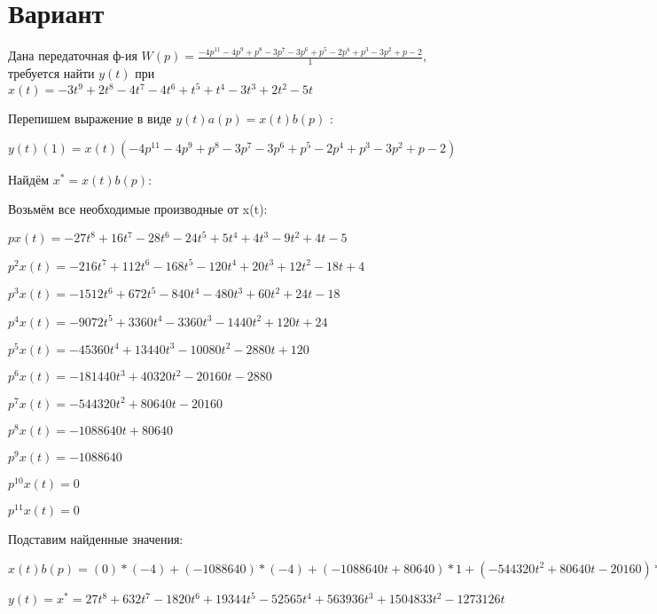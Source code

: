 \documentclass{article}
\begin{document}
{\section{Вариант}

Дана передаточная ф-ия $W(p)=\frac{-4p^{11}-4p^{9}+p^{8}-3p^{7}-3p^{6}+p^{5}-2p^{4}+p^{3}-3p^{2}+p-2}{1}$, требуется найти $y(t)$ при $x(t)=-3t^{9}+2t^{8}-4t^{7}-4t^{6}+t^{5}+t^{4}-3t^{3}+2t^{2}-5t$

Перепишем выражение в виде $y(t)a(p)=x(t)b(p)$ :

$y(t)(1)=x(t)(-4p^{11}-4p^{9}+p^{8}-3p^{7}-3p^{6}+p^{5}-2p^{4}+p^{3}-3p^{2}+p-2)$

Найдём $x^*=x(t)b(p)$:

Возьмём все необходимые производные от x(t):

$px(t)=-27t^{8}+16t^{7}-28t^{6}-24t^{5}+5t^{4}+4t^{3}-9t^{2}+4t-5$

$p^2x(t)=-216t^{7}+112t^{6}-168t^{5}-120t^{4}+20t^{3}+12t^{2}-18t+4$

$p^3x(t)=-1512t^{6}+672t^{5}-840t^{4}-480t^{3}+60t^{2}+24t-18$

$p^4x(t)=-9072t^{5}+3360t^{4}-3360t^{3}-1440t^{2}+120t+24$

$p^5x(t)=-45360t^{4}+13440t^{3}-10080t^{2}-2880t+120$

$p^6x(t)=-181440t^{3}+40320t^{2}-20160t-2880$

$p^7x(t)=-544320t^{2}+80640t-20160$

$p^8x(t)=-1088640t+80640$

$p^9x(t)=-1088640$

$p^10x(t)=0$

$p^11x(t)=0$

Подставим найденные значения:

$x(t)b(p) = (0)*(-4)+(-1088640)*(-4)+(-1088640t+80640)*1+(-544320t^{2}+80640t-20160)*(-3)+(-181440t^{3}+40320t^{2}-20160t-2880)*(-3)+(-45360t^{4}+13440t^{3}-10080t^{2}-2880t+120)*1+(-9072t^{5}+3360t^{4}-3360t^{3}-1440t^{2}+120t+24)*(-2)+(-1512t^{6}+672t^{5}-840t^{4}-480t^{3}+60t^{2}+24t-18)*1+(-216t^{7}+112t^{6}-168t^{5}-120t^{4}+20t^{3}+12t^{2}-18t+4)*(-3)+(-27t^{8}+16t^{7}-28t^{6}-24t^{5}+5t^{4}+4t^{3}-9t^{2}+4t-5)*1+(-27t^{8}+16t^{7}-28t^{6}-24t^{5}+5t^{4}+4t^{3}-9t^{2}+4t-5)*(-2)=27t^{8}+632t^{7}-1820t^{6}+19344t^{5}-52565t^{4}+563936t^{3}+1504833t^{2}-1273126t$





$y(t)=x^*=27t^{8}+632t^{7}-1820t^{6}+19344t^{5}-52565t^{4}+563936t^{3}+1504833t^{2}-1273126t$

}
\end{document}

